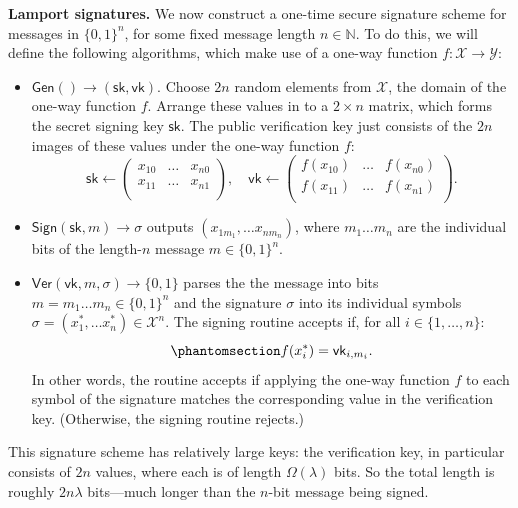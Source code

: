 \documentclass[
  letterpaper,
]{scrbook}
\providecommand{\tightlist}{%
  \setlength{\itemsep}{0pt}\setlength{\parskip}{0pt}}
\newcommand{\N}{\mathbb{N}}
\newcommand{\zo}{\{0,1\}}
\newcommand{\bin}{\zo}
\newcommand{\zon}{\{0,1\}^n}
\newcommand{\calX}{\mathcal{X}}
\newcommand{\calY}{\mathcal{Y}}
\newcommand{\Gen}{\mathsf{Gen}}
\newcommand{\Sign}{\mathsf{Sign}}
\newcommand{\Ver}{\mathsf{Ver}}
\newcommand{\sk}{\mathsf{sk}}
\newcommand{\vk}{\mathsf{vk}}
\newcommand{\sig}{\sigma}
\theoremstyle{definition}
\theoremstyle{plain}
\theoremstyle{plain}
\theoremstyle{remark}
\begin{document}
\textbf{Lamport signatures.} We now construct a one-time secure
signature scheme for messages in \(\bin^n\), for some fixed message
length \(n \in \N\). To do this, we will define the following
algorithms, which make use of a one-way function
\(f \colon \calX \to \calY\):

\begin{itemize}
\tightlist
\item
  \(\Gen() \to (\sk, \vk)\). Choose \(2n\) random elements from
  \(\calX\), the domain of the one-way function \(f\). Arrange these
  values in to a \(2 \times n\) matrix, which forms the secret signing
  key \(\sk\). The public verification key just consists of the \(2n\)
  images of these values under the one-way function \(f\):
  \[ \sk \gets \begin{pmatrix}
  x_{10} & \ldots & x_{n0} \\
  x_{11} & \ldots & x_{n1} \\
  \end{pmatrix},\quad \vk \gets \begin{pmatrix}
  f(x_{10}) & \ldots & f(x_{n0}) \\
  f(x_{11}) & \ldots & f(x_{n1}) \\
  \end{pmatrix}.\]
\item
  \(\Sign(\sk, m) \to \sigma\) outputs \((x_{1m_1}, \ldots x_{nm_n})\),
  where \(m_1 \dots m_n\) are the individual bits of the length-\(n\)
  message \(m \in \zo^n\).
\item
  \(\Ver(\vk, m, \sig) \to \zo\) parses the the message into bits
  \(m = m_1\dots m_n \in \zon\) and the signature \(\sig\) into its
  individual symbols \(\sig = (x_1^*, \ldots x_n^*) \in \calX^n\). The
  signing routine accepts if, for all \(i \in \{1, \dots, n\}\):
  \begin{equation}\protect\phantomsection\label{eq-lamport}{
  f(x^*_i) = \vk_{i,m_i}.
  }\end{equation} In other words, the routine accepts if applying the
  one-way function \(f\) to each symbol of the signature matches the
  corresponding value in the verification key. (Otherwise, the signing
  routine rejects.)
\end{itemize}

This signature scheme has relatively large keys: the verification key,
in particular consists of \(2n\) values, where each is of length
\(\Omega(\lambda)\) bits. So the total length is roughly \(2n\lambda\)
bits---much longer than the \(n\)-bit message being signed.
\end{document}
